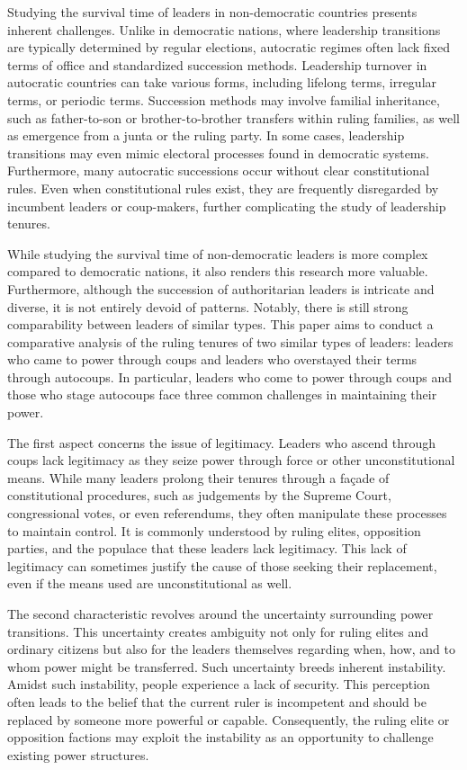 \documentclass[
  12pt,
  a4paper,
  12pt]{article}
\begin{document}
Studying the survival time of leaders in non-democratic countries
presents inherent challenges. Unlike in democratic nations, where
leadership transitions are typically determined by regular elections,
autocratic regimes often lack fixed terms of office and standardized
succession methods. Leadership turnover in autocratic countries can take
various forms, including lifelong terms, irregular terms, or periodic
terms. Succession methods may involve familial inheritance, such as
father-to-son or brother-to-brother transfers within ruling families, as
well as emergence from a junta or the ruling party. In some cases,
leadership transitions may even mimic electoral processes found in
democratic systems. Furthermore, many autocratic successions occur
without clear constitutional rules. Even when constitutional rules
exist, they are frequently disregarded by incumbent leaders or
coup-makers, further complicating the study of leadership tenures.

While studying the survival time of non-democratic leaders is more
complex compared to democratic nations, it also renders this research
more valuable. Furthermore, although the succession of authoritarian
leaders is intricate and diverse, it is not entirely devoid of patterns.
Notably, there is still strong comparability between leaders of similar
types. This paper aims to conduct a comparative analysis of the ruling
tenures of two similar types of leaders: leaders who came to power
through coups and leaders who overstayed their terms through autocoups.
In particular, leaders who come to power through coups and those who
stage autocoups face three common challenges in maintaining their power.

The first aspect concerns the issue of legitimacy. Leaders who ascend
through coups lack legitimacy as they seize power through force or other
unconstitutional means. While many leaders prolong their tenures through
a façade of constitutional procedures, such as judgements by the Supreme
Court, congressional votes, or even referendums, they often manipulate
these processes to maintain control. It is commonly understood by ruling
elites, opposition parties, and the populace that these leaders lack
legitimacy. This lack of legitimacy can sometimes justify the cause of
those seeking their replacement, even if the means used are
unconstitutional as well.

The second characteristic revolves around the uncertainty surrounding
power transitions. This uncertainty creates ambiguity not only for
ruling elites and ordinary citizens but also for the leaders themselves
regarding when, how, and to whom power might be transferred. Such
uncertainty breeds inherent instability. Amidst such instability, people
experience a lack of security. This perception often leads to the belief
that the current ruler is incompetent and should be replaced by someone
more powerful or capable. Consequently, the ruling elite or opposition
factions may exploit the instability as an opportunity to challenge
existing power structures.
\end{document}
